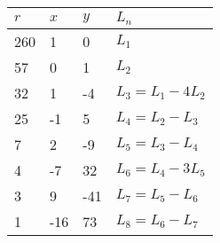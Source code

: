\documentclass[border=0.5cm]{standalone}
\begin{document}
\begin{tabular}{llll}
\toprule
 $r$ & $x$ & $y$ & $L_n$\\
\midrule
 260 & 1 & 0 & $L_1$\\
 57 & 0 & 1 & $L_2$\\
\midrule
 32 & 1 & -4 & $L_{3} = L_{1} - 4L_{2}$ \\
 25 & -1 & 5 & $L_{4} = L_{2} - L_{3}$ \\
 7 & 2 & -9 & $L_{5} = L_{3} - L_{4}$ \\
 4 & -7 & 32 & $L_{6} = L_{4} - 3L_{5}$ \\
 3 & 9 & -41 & $L_{7} = L_{5} - L_{6}$ \\
\midrule
 1 & -16 & 73 & $L_8 = L_6 - L_7$ \\
\bottomrule
\end{tabular}
\end{document}
